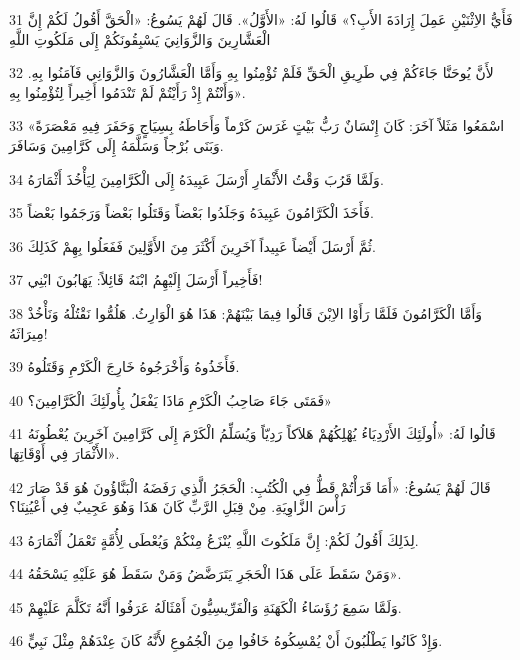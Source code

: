 \par 31 فَأَيُّ الاِثْنَيْنِ عَمِلَ إِرَادَةَ الأَبِ؟» قَالُوا لَهُ: «الأَوَّلُ». قَالَ لَهُمْ يَسُوعُ: «الْحَقَّ أَقُولُ لَكُمْ إِنَّ الْعَشَّارِينَ وَالزَّوَانِيَ يَسْبِقُونَكُمْ إِلَى مَلَكُوتِ اللَّهِ
\par 32 لأَنَّ يُوحَنَّا جَاءَكُمْ فِي طَرِيقِ الْحَقِّ فَلَمْ تُؤْمِنُوا بِهِ وَأَمَّا الْعَشَّارُونَ وَالزَّوَانِي فَآمَنُوا بِهِ. وَأَنْتُمْ إِذْ رَأَيْتُمْ لَمْ تَنْدَمُوا أَخِيراً لِتُؤْمِنُوا بِهِ».
\par 33 «اسْمَعُوا مَثَلاً آخَرَ: كَانَ إِنْسَانٌ رَبُّ بَيْتٍ غَرَسَ كَرْماً وَأَحَاطَهُ بِسِيَاجٍ وَحَفَرَ فِيهِ مَعْصَرَةً وَبَنَى بُرْجاً وَسَلَّمَهُ إِلَى كَرَّامِينَ وَسَافَرَ.
\par 34 وَلَمَّا قَرُبَ وَقْتُ الأَثْمَارِ أَرْسَلَ عَبِيدَهُ إِلَى الْكَرَّامِينَ لِيَأْخُذَ أَثْمَارَهُ.
\par 35 فَأَخَذَ الْكَرَّامُونَ عَبِيدَهُ وَجَلَدُوا بَعْضاً وَقَتَلُوا بَعْضاً وَرَجَمُوا بَعْضاً.
\par 36 ثُمَّ أَرْسَلَ أَيْضاً عَبِيداً آخَرِينَ أَكْثَرَ مِنَ الأَوَّلِينَ فَفَعَلُوا بِهِمْ كَذَلِكَ.
\par 37 فَأَخِيراً أَرْسَلَ إِلَيْهِمُ ابْنَهُ قَائِلاً: يَهَابُونَ ابْنِي!
\par 38 وَأَمَّا الْكَرَّامُونَ فَلَمَّا رَأَوْا الاِبْنَ قَالُوا فِيمَا بَيْنَهُمْ: هَذَا هُوَ الْوَارِثُ. هَلُمُّوا نَقْتُلْهُ وَنَأْخُذْ مِيرَاثَهُ!
\par 39 فَأَخَذُوهُ وَأَخْرَجُوهُ خَارِجَ الْكَرْمِ وَقَتَلُوهُ.
\par 40 فَمَتَى جَاءَ صَاحِبُ الْكَرْمِ مَاذَا يَفْعَلُ بِأُولَئِكَ الْكَرَّامِينَ؟»
\par 41 قَالُوا لَهُ: «أُولَئِكَ الأَرْدِيَاءُ يُهْلِكُهُمْ هَلاَكاً رَدِيّاً وَيُسَلِّمُ الْكَرْمَ إِلَى كَرَّامِينَ آخَرِينَ يُعْطُونَهُ الأَثْمَارَ فِي أَوْقَاتِهَا».
\par 42 قَالَ لَهُمْ يَسُوعُ: «أَمَا قَرَأْتُمْ قَطُّ فِي الْكُتُبِ: الْحَجَرُ الَّذِي رَفَضَهُ الْبَنَّاؤُونَ هُوَ قَدْ صَارَ رَأْسَ الزَّاوِيَةِ. مِنْ قِبَلِ الرَّبِّ كَانَ هَذَا وَهُوَ عَجِيبٌ فِي أَعْيُنِنَا؟
\par 43 لِذَلِكَ أَقُولُ لَكُمْ: إِنَّ مَلَكُوتَ اللَّهِ يُنْزَعُ مِنْكُمْ وَيُعْطَى لِأُمَّةٍ تَعْمَلُ أَثْمَارَهُ.
\par 44 وَمَنْ سَقَطَ عَلَى هَذَا الْحَجَرِ يَتَرَضَّضُ وَمَنْ سَقَطَ هُوَ عَلَيْهِ يَسْحَقُهُ».
\par 45 وَلَمَّا سَمِعَ رُؤَسَاءُ الْكَهَنَةِ وَالْفَرِّيسِيُّونَ أَمْثَالَهُ عَرَفُوا أَنَّهُ تَكَلَّمَ عَلَيْهِمْ.
\par 46 وَإِذْ كَانُوا يَطْلُبُونَ أَنْ يُمْسِكُوهُ خَافُوا مِنَ الْجُمُوعِ لأَنَّهُ كَانَ عِنْدَهُمْ مِثْلَ نَبِيٍّ.

